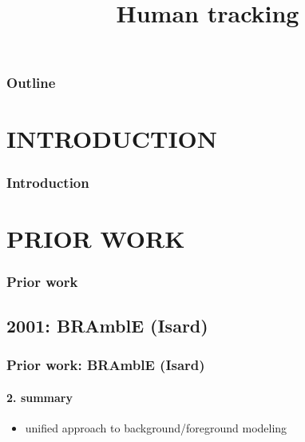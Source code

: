
\title{Human tracking}
\begin{frame}[plain]\logoTechTower
	\titlepage
\end{frame}

\begin{frame}
\frametitle{Outline}
\logoCSIPCPL\logoTechTower
	\setcounter{tocdepth}{1}	
	\tableofcontents
\end{frame}

\section{INTRODUCTION}
\begin{frame}
\frametitle{Introduction}
\framesubtitle{}
\logoCSIPCPL\mypagenum
\end{frame}


\section{PRIOR WORK}
\begin{frame}
\frametitle{Prior work}
\framesubtitle{}
\logoCSIPCPL\mypagenum
\end{frame}



\subsection{2001: BRAmblE (Isard)}
\begin{frame}
\frametitle{Prior work: BRAmblE (Isard)}
\framesubtitle{2. summary}
\mypagenum
	\begin{itemize}
		\item unified approach to background/foreground modeling
	\end{itemize}
\end{frame}











